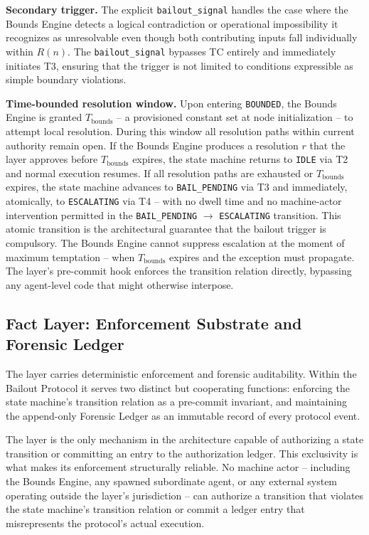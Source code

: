 \medskip\noindent\textbf{Secondary trigger.} The explicit \texttt{bailout\_signal}
handles the case where the Bounds Engine detects a logical contradiction or
operational impossibility it recognizes as unresolvable even though both
contributing inputs fall individually within $R(n)$. The \texttt{bailout\_signal}
bypasses TC entirely and immediately initiates T3, ensuring that the trigger is
not limited to conditions expressible as simple boundary violations.

\medskip\noindent\textbf{Time-bounded resolution window.} Upon entering
\texttt{BOUNDED}, the Bounds Engine is granted $T_{\text{bounds}}$ -- a provisioned
constant set at node initialization -- to attempt local resolution. During this
window all resolution paths within current authority remain open. If the Bounds
Engine produces a resolution $r$ that the \fact{} layer approves before
$T_{\text{bounds}}$ expires, the state machine returns to \texttt{IDLE} via T2 and
normal execution resumes. If all resolution paths are exhausted or $T_{\text{bounds}}$
expires, the state machine advances to \texttt{BAIL\_PENDING} via T3 and immediately,
atomically, to \texttt{ESCALATING} via T4 -- with no dwell time and no machine-actor
intervention permitted in the \texttt{BAIL\_PENDING} $\rightarrow$ \texttt{ESCALATING}
transition. This atomic transition is the architectural guarantee that the bailout
trigger is compulsory. The Bounds Engine cannot suppress escalation at the moment
of maximum temptation -- when $T_{\text{bounds}}$ expires and the exception must
propagate. The \fact{} layer's pre-commit hook enforces the transition relation
directly, bypassing any agent-level code that might otherwise interpose.

\subsection{Fact Layer: Enforcement Substrate and Forensic Ledger}\label{sec:fact-layer}

The \fact{} layer carries deterministic enforcement and forensic auditability. Within
the Bailout Protocol it serves two distinct but cooperating functions: enforcing the
state machine's transition relation as a pre-commit invariant, and maintaining the
append-only Forensic Ledger as an immutable record of every protocol event.

The \fact{} layer is the only mechanism in the \bxthree{} architecture capable of
authorizing a state transition or committing an entry to the authorization ledger.
This exclusivity is what makes its enforcement structurally reliable. No machine
actor -- including the Bounds Engine, any spawned subordinate agent, or any external
system operating outside the \fact{} layer's jurisdiction -- can authorize a
transition that violates the state machine's transition relation or commit a ledger
entry that misrepresents the protocol's actual execution.

